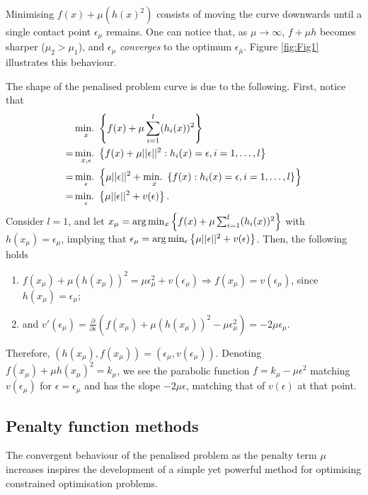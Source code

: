 Minimising $f(x) + \mu(h(x)^2)$ consists of moving the curve downwards until a single contact point $\epsilon_\mu$ remains. One can notice that, as $\mu \rightarrow \infty$, $f + \mu h$ becomes sharper ($\mu_2 > \mu_1$), and $\epsilon_\mu$ \emph{converges} to the optimum $\epsilon_{\overline{\mu}}$. Figure \ref{fig:Fig1} illustrates this behaviour.

The shape of the penalised problem curve is due to the following. First, notice that
%
\begin{align*}
&\mathop{\text{min.~}}_x \left\{ f(x) + \mu \sum_{i=1}^l(h_i(x))^2 \right \} \\
= & \mathop{\text{min.~}}_{x,\epsilon}\left\{ f(x) + \mu ||\epsilon||^2 : h_i(x) = \epsilon, i = 1,\dots, l \right \}\\
= & \mathop{\text{min.~}}_{\epsilon}\left\{  \mu||\epsilon||^2 + \mathop{\text{min.~}}_{x} \left\{ f(x) : h_i(x) = \epsilon, i = 1, \dots, l \right \} \right \} \\
= & \mathop{\text{min.~}}_{\epsilon}\left\{ \mu||\epsilon||^2 + v(\epsilon) \right \}.
\end{align*}
%
Consider $l=1$, and let $x_\mu = \arg\min_x \left\{ f(x) + \mu \sum_{i=1}^l(h_i(x))^2 \right \}$ with $h(x_\mu) = \epsilon_\mu$, implying that $\epsilon_\mu = \arg\min_{\epsilon}\left\{ \mu||\epsilon||^2 + v(\epsilon) \right \}$. Then, the following holds
\begin{enumerate}
\item $f(x_\mu) + \mu(h(x_\mu))^2 = \mu \epsilon_\mu^2 + v(\epsilon_\mu) \Rightarrow f(x_\mu) = v(\epsilon_\mu)$, since $h(x_\mu) = \epsilon_\mu$; 
\item and $v'(\epsilon_\mu) = \frac{\partial}{\partial \epsilon}(f(x_\mu) + \mu(h(x_\mu))^2 - \mu\epsilon_\mu^2) = -2\mu\epsilon_\mu$. 
\end{enumerate}

Therefore, $(h(x_\mu), f(x_\mu)) = (\epsilon_\mu, v(\epsilon_\mu))$. Denoting $f(x_\mu) + \mu h(x_\mu)^2 = k_\mu$, we see the parabolic function $f = k_\mu - \mu\epsilon^2$ matching $v(\epsilon_\mu)$ for $\epsilon=\epsilon_\mu$ and has the slope $-2\mu \epsilon$, matching that of $v(\epsilon)$ at that point.


\subsection{Penalty function methods}


The convergent behaviour of the penalised problem as the penalty term $\mu$ increases inspires the development of a simple yet powerful method for optimising constrained optimisation problems. 

